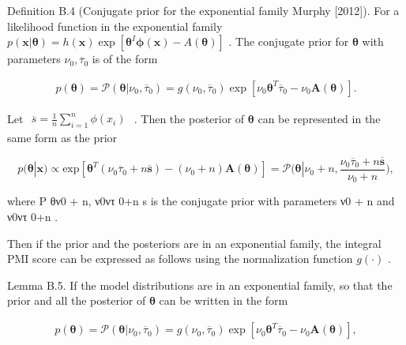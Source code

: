 Definition B.4 (Conjugate prior for the exponential family Murphy
{[}2012{]}). For a likelihood function in the exponential family
\(p ( \mathbf x | \pmb \theta ) = h ( \mathbf x ) \exp \left[ \pmb \theta ^ { I } \pmb \phi ( \mathbf x ) - A ( \pmb \theta ) \right]\)
. The conjugate prior for \(\pmb \theta\) with parameters
\(\nu _ { 0 } , \overline { { \tau } } _ { 0 }\) is of the form

\[
\begin{array} { r } { p ( \pmb { \theta } ) = \mathcal { P } ( \pmb { \theta } | \nu _ { 0 } , \overline { { \tau } } _ { 0 } ) = g ( \nu _ { 0 } , \overline { { \tau } } _ { 0 } ) \exp \left[ \nu _ { 0 } \pmb { \theta } ^ { T } \overline { { \tau } } _ { 0 } - \nu _ { 0 } \pmb { A } ( \pmb { \theta } ) \right] . } \end{array}
\]

Let
\(\begin{array} { r } { \overline { { s } } = \frac { 1 } { n } \sum _ { i = 1 } ^ { n } \phi ( x _ { i } ) } \end{array}\)
. Then the posterior of \(\pmb \theta\) can be represented in the same
form as the prior

\[
p ( \pmb \theta | \mathbf x ) \propto \mathrm { e x p } \left[ \pmb \theta ^ { T } ( \nu _ { 0 } \overline { { \tau } } _ { 0 } + n \overline { { \pmb s } } ) - ( \nu _ { 0 } + n ) \pmb A ( \pmb \theta ) \right] = \mathcal { P } \big ( \pmb \theta | \nu _ { 0 } + n , \frac { \nu _ { 0 } \overline { { \tau } } _ { 0 } + n \overline { { \pmb s } } } { \nu _ { 0 } + n } \big ) ,
\]

where P θ\textbar ν0 + n, ν0ντ 0+n s is the conjugate prior with
parameters ν0 + n and ν0ντ 0+n .

Then if the prior and the posteriors are in an exponential family, the
integral PMI score can be expressed as follows using the normalization
function \(g ( \cdot )\) .

Lemma B.5. If the model distributions are in an exponential family, so
that the prior and all the posterior of \(\pmb \theta\) can be written
in the form

\[
\begin{array} { r } { p ( \pmb { \theta } ) = \mathcal { P } ( \pmb { \theta } | \nu _ { 0 } , \overline { { \tau } } _ { 0 } ) = g ( \nu _ { 0 } , \overline { { \tau } } _ { 0 } ) \exp \left[ \nu _ { 0 } \pmb { \theta } ^ { T } \overline { { \tau } } _ { 0 } - \nu _ { 0 } \pmb { A } ( \pmb { \theta } ) \right] , } \end{array}
\]


